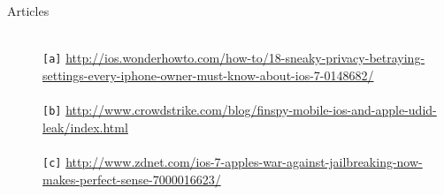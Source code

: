 \documentclass[12pt]{article}
\begin{document}
\begin{description}
\item [Articles] \hfill \\
  \texttt{[a]} \url{http://ios.wonderhowto.com/how-to/18-sneaky-privacy-betraying-settings-every-iphone-owner-must-know-about-ios-7-0148682/}  \\\\
 \texttt{[b]} \url{http://www.crowdstrike.com/blog/finspy-mobile-ios-and-apple-udid-leak/index.html} \\\\
 \texttt{[c]} \url{http://www.zdnet.com/ios-7-apples-war-against-jailbreaking-now-makes-perfect-sense-7000016623/} 

\end{description}
\end{document}
